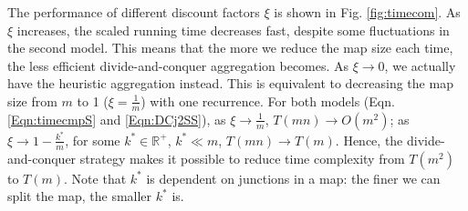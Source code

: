  
The performance of different discount factors $\xi$ is shown in Fig. \ref{fig:timecom}. 
As $\xi$ increases, the scaled running time decreases fast, despite some fluctuations in the second model. 
This means that the more we reduce the map size each time, the less efficient divide-and-conquer aggregation becomes. 
As $\xi\rightarrow 0$, we actually have the heuristic aggregation instead. 
This is equivalent to decreasing the map size from $m$ to 1 ($\xi = \frac{1}{m}$) with one recurrence. 
For both models (Eqn. \ref{Eqn:timecmpS} and \ref{Eqn:DCj2SS}), as $\xi\rightarrow\frac{1}{m}$, $T(mn)\rightarrow O(m^2)$; as $\xi\rightarrow 1-\frac{k^*}{m}$, for some $k^*\in \mathbb{R}^+$, $k^*\ll m$, $T(mn)\rightarrow T(m)$. 
Hence, the divide-and-conquer strategy makes it possible to reduce time complexity from $T(m^2)$ to $T(m)$. Note that $k^*$ is dependent on junctions in a map: the finer we can split the map, the smaller $k^*$ is.     

